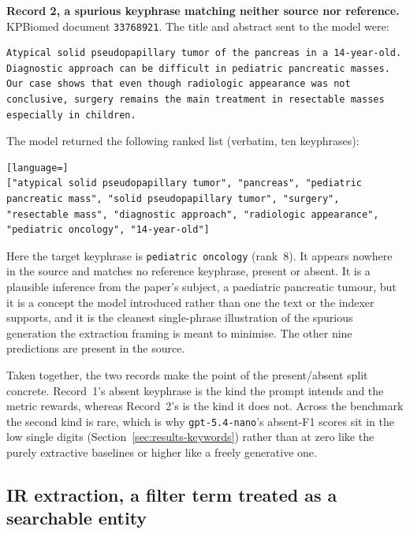\medskip
\noindent\textbf{Record 2, a spurious keyphrase matching neither source nor
reference.} KPBiomed document \lstinline|33768921|. The title and abstract sent to
the model were:

\begin{lstlisting}
Atypical solid pseudopapillary tumor of the pancreas in a 14-year-old. Diagnostic approach can be difficult in pediatric pancreatic masses. Our case shows that even though radiologic appearance was not conclusive, surgery remains the main treatment in resectable masses especially in children.
\end{lstlisting}

\noindent The model returned the following ranked list (verbatim, ten
keyphrases):

\begin{lstlisting}[language=]
["atypical solid pseudopapillary tumor", "pancreas", "pediatric pancreatic mass", "solid pseudopapillary tumor", "surgery", "resectable mass", "diagnostic approach", "radiologic appearance", "pediatric oncology", "14-year-old"]
\end{lstlisting}

\noindent Here the target keyphrase is \lstinline|pediatric oncology| (rank~8). It
appears nowhere in the source and matches no reference keyphrase, present or
absent. It is a plausible inference from the paper's subject, a paediatric
pancreatic tumour, but it is a concept the model introduced rather than one the
text or the indexer supports, and it is the cleanest single-phrase illustration of
the spurious generation the extraction framing is meant to minimise. The other
nine predictions are present in the source.

\medskip
\noindent Taken together, the two records make the point of the present/absent
split concrete. Record~1's absent keyphrase is the kind the prompt intends and the
metric rewards, whereas Record~2's is the kind it does not. Across the benchmark the
second kind is rare, which is why \texttt{gpt-5.4-nano}'s absent-F1 scores sit in
the low single digits (Section~\ref{sec:results-keywords}) rather than at zero
like the purely extractive baselines or higher like a freely generative one.

\subsection*{IR extraction, a filter term treated as a searchable entity}

